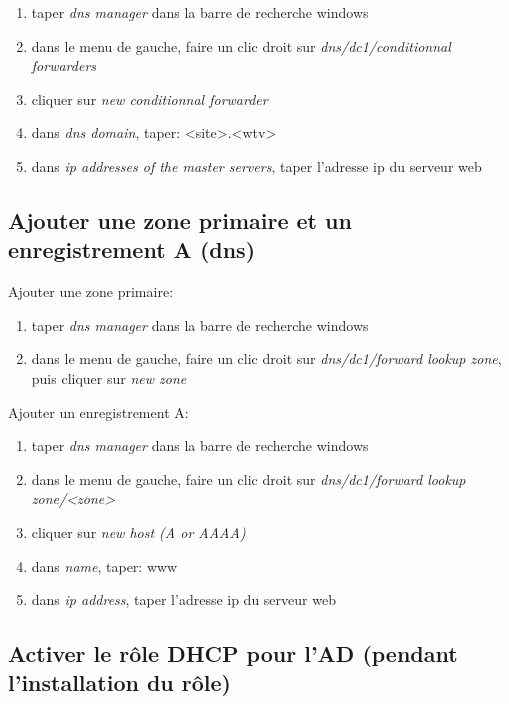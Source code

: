 \documentclass[a4paper]{article}
\begin{document}
\begin{enumerate}
    \item taper \textit{dns manager} dans la barre de recherche windows
    \item dans le menu de gauche, faire un clic droit sur \textit{dns/dc1/conditionnal forwarders}
    \item cliquer sur \textit{new conditionnal forwarder}
    \item dans \textit{dns domain}, taper: <site>.<wtv>
    \item dans \textit{ip addresses of the master servers}, taper l'adresse ip du serveur web
\end{enumerate}





\subsection{Ajouter une zone primaire et un enregistrement A (dns)}



Ajouter une zone primaire:
\begin{enumerate}
    \item taper \textit{dns manager} dans la barre de recherche windows
    \item dans le menu de gauche, faire un clic droit sur \textit{dns/dc1/forward lookup zone}, puis cliquer sur \textit{new zone}
\end{enumerate}


Ajouter un enregistrement A:
\begin{enumerate}
    \item taper \textit{dns manager} dans la barre de recherche windows
    \item dans le menu de gauche, faire un clic droit sur \textit{dns/dc1/forward lookup zone/<zone>}
    \item cliquer sur \textit{new host (A or AAAA)}
    \item dans \textit{name}, taper: www
    \item dans \textit{ip address}, taper l'adresse ip du serveur web
\end{enumerate}





\subsection{Activer le rôle DHCP pour l'AD (pendant l'installation du rôle)}
\end{document}
